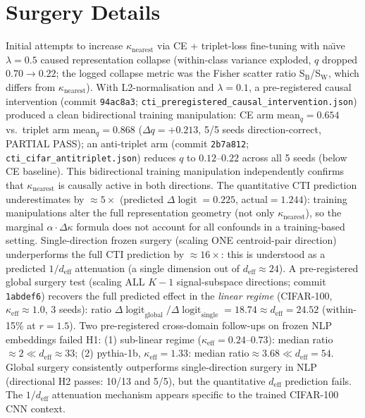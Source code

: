 \documentclass{article}
\DeclareMathOperator{\logit}{logit}
\begin{document}
\section{Surgery Details}
\label{app:surgery-details}
Initial attempts to increase $\kappa_{\mathrm{nearest}}$ via CE + triplet-loss fine-tuning with na\"{\i}ve $\lambda=0.5$ caused representation collapse (within-class variance exploded, $q$ dropped $0.70\to0.22$; the logged collapse metric was the Fisher scatter ratio S$_\mathrm{B}$/S$_\mathrm{W}$, which differs from $\kappa_{\mathrm{nearest}}$). With L2-normalisation and $\lambda=0.1$, a pre-registered causal intervention (commit \texttt{94ac8a3}; \texttt{cti\_preregistered\_causal\_intervention.json}) produced a clean bidirectional training manipulation: CE arm mean$_q=0.654$ vs.\ triplet arm mean$_q=0.868$ ($\Delta q=+0.213$, 5/5 seeds direction-correct, PARTIAL PASS); an anti-triplet arm (commit \texttt{2b7a812}; \texttt{cti\_cifar\_antitriplet.json}) reduces $q$ to $0.12$--$0.22$ across all 5 seeds (below CE baseline). This bidirectional training manipulation independently confirms that $\kappa_{\mathrm{nearest}}$ is causally active in both directions. The quantitative CTI prediction underestimates by $\approx5\times$ (predicted $\Delta\logit=0.225$, actual$=1.244$): training manipulations alter the full representation geometry (not only $\kappa_{\mathrm{nearest}}$), so the marginal $\alpha\cdot\Delta\kappa$ formula does not account for all confounds in a training-based setting. Single-direction frozen surgery (scaling ONE centroid-pair direction) underperforms the full CTI prediction by $\approx16\times$: this is understood as a predicted $1/d_{\mathrm{eff}}$ attenuation (a single dimension out of $d_{\mathrm{eff}}\approx24$). A pre-registered global surgery test (scaling ALL $K-1$ signal-subspace directions; commit \texttt{1abdef6}) recovers the full predicted effect in the \emph{linear regime} (CIFAR-100, $\kappa_{\mathrm{eff}}\approx1.0$, 3 seeds): ratio $\Delta\logit_{\mathrm{global}}/\Delta\logit_{\mathrm{single}} = 18.74 \approx d_{\mathrm{eff}} = 24.52$ (within-15\% at $r=1.5$). Two pre-registered cross-domain follow-ups on frozen NLP embeddings failed H1: (1) sub-linear regime ($\kappa_{\mathrm{eff}}=0.24$--$0.73$): median ratio$\approx2\ll d_{\mathrm{eff}}\approx33$; (2) pythia-1b, $\kappa_{\mathrm{eff}}=1.33$: median ratio$\approx3.68\ll d_{\mathrm{eff}}=54$. Global surgery consistently outperforms single-direction surgery in NLP (directional H2 passes: 10/13 and 5/5), but the quantitative $d_{\mathrm{eff}}$ prediction fails. The $1/d_{\mathrm{eff}}$ attenuation mechanism appears specific to the trained CIFAR-100 CNN context.
\end{document}
